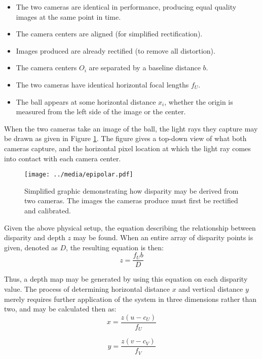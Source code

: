 \begin{itemize} \itemsep=-0.5em
	\item The two cameras are identical in performance, producing equal quality images at the same point in time.
	\item The camera centers are aligned (for simplified rectification).
	\item Images produced are already rectified (to remove all distortion).
	\item The camera centers $O_i$ are separated by a baseline distance $b$.
	\item The two cameras have identical horizontal focal lengths $f_U$.
	\item The ball appears at some horizontal distance $x_i$, whether the origin is measured from the left side of the image or the center.
\end{itemize}

When the two cameras take an image of the ball, the light rays they capture may be drawn as given in Figure \ref{epipolar}. The figure gives a top-down view of what both cameras capture, and the horizontal pixel location at which the light ray comes into contact with each camera center. 

\begin{figure}[ht]
    \centering
	\texttt{[image: ../media/epipolar.pdf]}
	\caption{Simplified graphic demonstrating how disparity may be derived from two cameras. The images the cameras produce must first be rectified and calibrated.}
	\label{epipolar}
\end{figure}

Given the above physical setup, the equation describing the relationship between disparity and depth $z$ may be found. When an entire array of disparity points is given, denoted as $D$, the resulting equation is then: 
\begin{equation}
z = \frac{f_U b}{D}
\label{eq_epi_z}
\end{equation}

Thus, a depth map may be generated by using this equation on each disparity value. The process of determining horizontal distance $x$ and vertical distance $y$ merely requires further application of the system in three dimensions rather than two, and may be calculated then as: 
\begin{equation}
x = \frac{z (u - c_U)}{f_U}
\end{equation}

\begin{equation}
y = \frac{z(v - c_V)}{f_V}
\end{equation}

